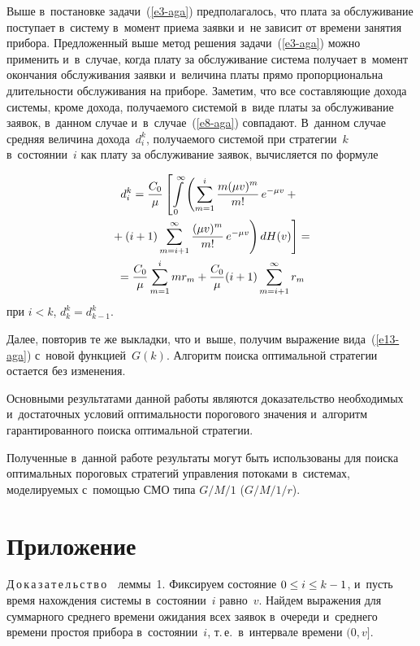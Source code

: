 \begin{multicols}{2}
  Выше в~постановке задачи~(\ref{e3-aga}) предполагалось, что плата за 
обслуживание поступает в~систему в~момент приема заявки и~не зависит от 
времени занятия прибора. Предложенный выше метод решения  
задачи~(\ref{e3-aga}) можно применить и~в~случае, когда плату за 
обслуживание система получает в~момент окончания обслуживания заявки 
и~величина платы прямо пропорциональна длительности обслуживания на 
приборе. Заметим, что все составляющие дохода системы, кроме дохода, 
получаемого системой в~виде платы за обслуживание заявок, в~данном случае 
и~в~случае~(\ref{e8-aga}) совпадают. В~данном случае  средняя величина 
дохода~$d_i^k$, получаемого системой при стратегии~$k$ в~состоянии~$i$ как 
плату за обслуживание заявок, вычисляется по формуле 

  \vspace*{-2pt}

\noindent
  \begin{multline*}
  d_i^k=\displaystyle\frac{\displaystyle C_0\mathstrut}{\displaystyle \mu\mathstrut}\left[ \int\limits_0^\infty \left( \sum\limits^i_{m=1} 
\displaystyle\frac{\displaystyle m(\mu v)^m\mathstrut}{\displaystyle m!\mathstrut}\,e^{-\mu v} +{}\right.\right.\\
\left.\left.{}+(i+1) \sum\limits^\infty_{m=i+1} \displaystyle\frac{\displaystyle (\mu 
v)^m\mathstrut}{\displaystyle m!\mathstrut}\,e^{-\mu v}\right) dH(v)\right]={}\\
  {}= \displaystyle\frac{\displaystyle C_0\mathstrut}{\displaystyle \mu\mathstrut} \sum\limits^i_{m=1} mr_m +\displaystyle\frac{\displaystyle C_0\mathstrut}{\displaystyle \mu\mathstrut} (i+1) 
\sum\limits^\infty_{m=i+1} r_m
  \end{multline*}
  при $i<k$, $d_k^k=d^k_{k-1}$.
  
  \pagebreak
  
  Далее, повторив те же выкладки, что и~выше, получим выражение 
вида~(\ref{e13-aga}) с~новой функцией~$G(k)$. Алгоритм поиска оптимальной 
стратегии остается без изменения.
  
  Основными результатами данной работы являются доказательство 
необходимых и~достаточных условий оптимальности порогового значения 
и~алгоритм гарантированного поиска оптимальной стратегии. 
  
  Полученные в~данной работе результаты могут быть использованы для 
поиска оптимальных пороговых стратегий управления потоками в~системах, 
моделируемых с~помощью СМО типа $G/M/1$ ($G/M/1/r$). 

\vspace*{-16pt}
   
{\small \section*{\raggedleft Приложение}
  
  \noindent
  Д\,о\,к\,а\,з\,а\,т\,е\,л\,ь\,с\,т\,в\,о\ \ леммы~1. Фиксируем состояние 
$0\hm\leq i\hm\leq k\hm-1$, и~пусть время нахождения системы в~состоянии~$i$ 
равно~$v$. Найдем выражения для суммарного среднего времени ожидания 
всех заявок в~очереди и~среднего времени простоя прибора в~состоянии~$i$, 
т.\,е.\ в~интервале времени $(0,v]$. 
  
}
\end{multicols}
